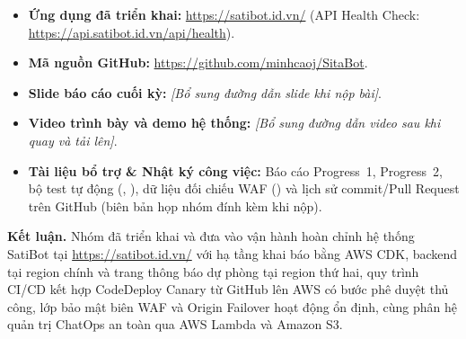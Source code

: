 \documentclass[a4paper,12pt]{article}
\begin{document}
\begin{itemize}[itemsep=3pt,topsep=2pt]
  \item \textbf{Ứng dụng đã triển khai:} \url{https://satibot.id.vn/} (API Health Check: \url{https://api.satibot.id.vn/api/health}).
  \item \textbf{Mã nguồn GitHub:} \url{https://github.com/minhcaoj/SitaBot}.
  \item \textbf{Slide báo cáo cuối kỳ:} \textit{[Bổ sung đường dẫn slide khi nộp bài]}.
  \item \textbf{Video trình bày và demo hệ thống:} \textit{[Bổ sung đường dẫn video sau khi quay và tải lên]}.
  \item \textbf{Tài liệu bổ trợ \& Nhật ký công việc:} Báo cáo Progress~1, Progress~2, bộ test tự động (, ), dữ liệu đối chiếu WAF () và lịch sử commit/Pull Request trên GitHub (biên bản họp nhóm đính kèm khi nộp).
\end{itemize}

\noindent\textbf{Kết luận.} Nhóm đã triển khai và đưa vào vận hành hoàn chỉnh hệ thống SatiBot tại \url{https://satibot.id.vn/} với hạ tầng khai báo bằng AWS CDK, backend tại region chính và trang thông báo dự phòng tại region thứ hai, quy trình CI/CD kết hợp CodeDeploy Canary từ GitHub lên AWS có bước phê duyệt thủ công, lớp bảo mật biên WAF và Origin Failover hoạt động ổn định, cùng phân hệ quản trị ChatOps an toàn qua AWS Lambda và Amazon S3.
\end{document}
